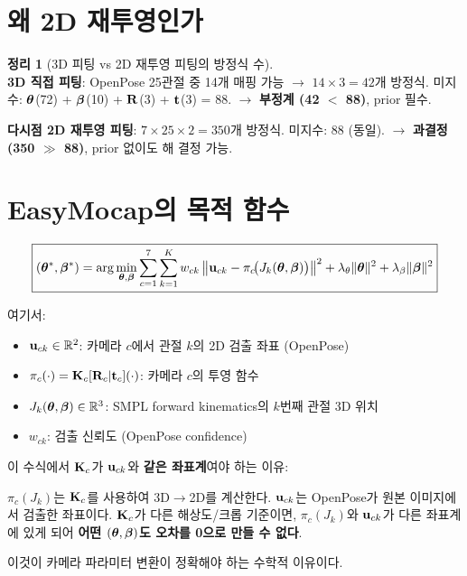 \documentclass[11pt, a4paper]{report}
\theoremstyle{definition}
\newtheorem{theorem}{정리}[chapter]
\theoremstyle{remark}
\begin{document}
\section{왜 2D 재투영인가}

\begin{theorem}[3D 피팅 vs 2D 재투영 피팅의 방정식 수]
\label{thm:equations}
~\\
\textbf{3D 직접 피팅}: OpenPose 25관절 중 14개 매핑 가능 $\rightarrow$ $14 \times 3 = 42$개 방정식.
미지수: $\bm{\theta}$(72) + $\bm{\beta}$(10) + $\mathbf{R}$(3) + $\mathbf{t}$(3) = 88.
$\rightarrow$ \textbf{부정계 (42 $<$ 88)}, prior 필수.

\textbf{다시점 2D 재투영 피팅}: $7 \times 25 \times 2 = 350$개 방정식.
미지수: 88 (동일).
$\rightarrow$ \textbf{과결정 (350 $\gg$ 88)}, prior 없이도 해 결정 가능.
\end{theorem}

\section{EasyMocap의 목적 함수}

\begin{equation}
\boxed{
(\bm{\theta}^*, \bm{\beta}^*) = \arg\min_{\bm{\theta}, \bm{\beta}}
\sum_{c=1}^{7} \sum_{k=1}^{K} w_{ck} \left\| \mathbf{u}_{ck} - \pi_c\!\big(J_k(\bm{\theta}, \bm{\beta})\big) \right\|^2
+ \lambda_\theta \|\bm{\theta}\|^2 + \lambda_\beta \|\bm{\beta}\|^2
}
\label{eq:easymocap}
\end{equation}

여기서:
\begin{itemize}[nosep]
  \item $\mathbf{u}_{ck} \in \mathbb{R}^2$: 카메라 $c$에서 관절 $k$의 2D 검출 좌표 (OpenPose)
  \item $\pi_c(\cdot) = \mathbf{K}_c [\mathbf{R}_c | \mathbf{t}_c] (\cdot)$: 카메라 $c$의 투영 함수
  \item $J_k(\bm{\theta}, \bm{\beta}) \in \mathbb{R}^3$: SMPL forward kinematics의 $k$번째 관절 3D 위치
  \item $w_{ck}$: 검출 신뢰도 (OpenPose confidence)
\end{itemize}

\begin{keyidea}
이 수식에서 $\mathbf{K}_c$가 $\mathbf{u}_{ck}$와 \textbf{같은 좌표계}여야 하는 이유:

$\pi_c(J_k)$는 $\mathbf{K}_c$를 사용하여 3D$\rightarrow$2D를 계산한다.
$\mathbf{u}_{ck}$는 OpenPose가 원본 이미지에서 검출한 좌표이다.
$\mathbf{K}_c$가 다른 해상도/크롭 기준이면,
$\pi_c(J_k)$와 $\mathbf{u}_{ck}$가 다른 좌표계에 있게 되어
\textbf{어떤 $(\bm{\theta}, \bm{\beta})$도 오차를 0으로 만들 수 없다}.

이것이 카메라 파라미터 변환이 정확해야 하는 수학적 이유이다.
\end{keyidea}
\end{document}

